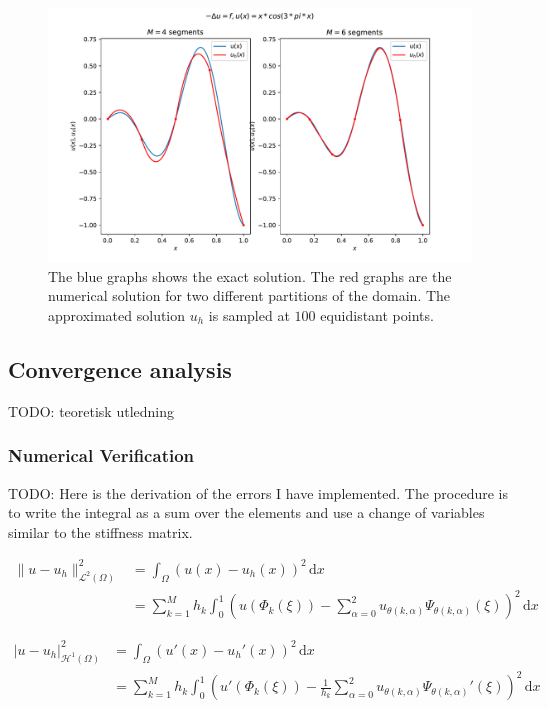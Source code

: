 \begin{figure}
  \centering
  \includegraphics[width=\textwidth]{Images/plots/task1_test_sol2.pdf}
  \caption{The blue graphs shows the exact solution.
  The red graphs are the numerical solution for two
different partitions of the domain.
The approximated solution \( u_h \) is sampled at \( 100 \)
equidistant points.}
  \label{fig:test_eq2}
\end{figure}

\subsection{Convergence analysis}


TODO: teoretisk utledning


\subsubsection{Numerical Verification}

TODO: Here is the derivation of the errors I have implemented.
The procedure is to write the integral as a sum over the elements
and use a change of variables similar to the stiffness matrix.

\begin{align}
  \lVert u - u_h \rVert_{\mathcal{L}^2(\Omega)}^2 
    &= \int_{\Omega}(u(x) - u_h(x))^2 \,\mathrm{d}x \\
    &= \sum_{k=1}^{M} h_k \int_{0}^{1}
    \left(
    u(\Phi_k(\xi)) 
      - \sum_{\alpha=0}^{2} u_{\theta(k, \alpha)} \Psi_{\theta(k, \alpha)}(\xi)
    \right)^2 \,\mathrm{d}x
\end{align}

\begin{align}
  \lvert u - u_h \rvert_{\mathcal{H}^1(\Omega)}^2 
    &= \int_{\Omega}(u'(x) - u_h'(x))^2 \,\mathrm{d}x \\
    &= \sum_{k=1}^{M} h_k \int_{0}^{1}
    \left(
    u'(\Phi_k(\xi)) 
      - \frac{1}{h_k} \sum_{\alpha=0}^{2} u_{\theta(k, \alpha)} \Psi_{\theta(k, \alpha)}'(\xi)
    \right)^2 \,\mathrm{d}x
\end{align}

